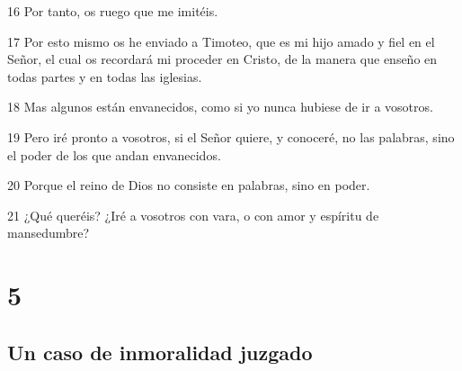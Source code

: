 \par 16 Por tanto, os ruego que me imitéis.
\par 17 Por esto mismo os he enviado a Timoteo, que es mi hijo amado y fiel en el Señor, el cual os recordará mi proceder en Cristo, de la manera que enseño en todas partes y en todas las iglesias.
\par 18 Mas algunos están envanecidos, como si yo nunca hubiese de ir a vosotros.
\par 19 Pero iré pronto a vosotros, si el Señor quiere, y conoceré, no las palabras, sino el poder de los que andan envanecidos.
\par 20 Porque el reino de Dios no consiste en palabras, sino en poder.
\par 21 ¿Qué queréis? ¿Iré a vosotros con vara, o con amor y espíritu de mansedumbre?

\chapter{5}

\section*{Un caso de inmoralidad juzgado}

